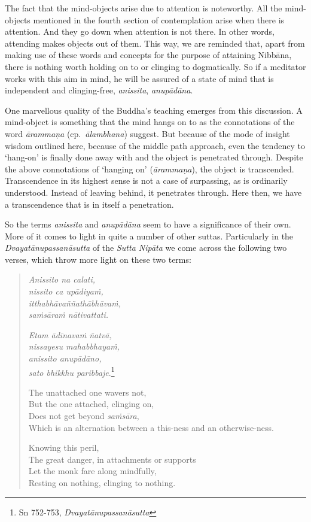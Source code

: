 The fact that the mind-objects arise due to attention is noteworthy. All the mind-objects mentioned in the fourth section of contemplation arise when there is attention. And they go down when attention is not there. In other words, attending makes objects out of them. This way, we are reminded that, apart from making use of these words and concepts for the purpose of attaining Nibbāna, there is nothing worth holding on to or clinging to dogmatically. So if a meditator works with this aim in mind, he will be assured of a state of mind that is independent and clinging-free, \emph{anissita}, \emph{anupādāna}.

One marvellous quality of the Buddha's teaching emerges from this discussion. A mind-object is something that the mind hangs on to as the connotations of the word \emph{ārammaṇa} (cp.~\emph{ālambhana}) suggest. But because of the mode of insight wisdom outlined here, because of the middle path approach, even the tendency to `hang-on' is finally done away with and the object is penetrated through. Despite the above connotations of `hanging on' (\emph{ārammaṇa}), the object is transcended. Transcendence in its highest sense is not a case of surpassing, as is ordinarily understood. Instead of leaving behind, it penetrates through. Here then, we have a transcendence that is in itself a penetration.

So the terms \emph{anissita} and \emph{anupādāna} seem to have a significance of their own. More of it comes to light in quite a number of other suttas. Particularly in the \emph{Dvayatānupassanāsutta} of the \emph{Sutta Nipāta} we come across the following two verses, which throw more light on these two terms:

\enlargethispage{\baselineskip}

\begin{quote}
\emph{Anissito na calati,}\\
\emph{nissito ca upādiyaṁ,}\\
\emph{itthabhāvaññathābhāvaṁ,}\\
\emph{saṁsāraṁ nātivattati.}

\emph{Etam ādīnavaṁ ñatvā,}\\
\emph{nissayesu mahabbhayaṁ,}\\
\emph{anissito anupādāno,}\\
\emph{sato bhikkhu paribbaje}.\footnote{Sn 752-753, \emph{Dvayatānupassanāsutta}}

The unattached one wavers not,\\
But the one attached, clinging on,\\
Does not get beyond \emph{saṁsāra},\\
Which is an alternation between a this-ness and an otherwise-ness.

Knowing this peril,\\
The great danger, in attachments or supports\\
Let the monk fare along mindfully,\\
Resting on nothing, clinging to nothing.
\end{quote}

